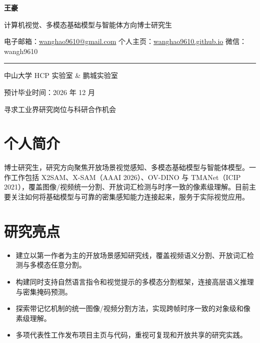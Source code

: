 \documentclass[UTF8,10pt,letterpaper,fontset=fandol]{ctexart}
\begin{document}
\fontsize{9.78}{11.75}\selectfont

\begin{minipage}{\textwidth}
    \vspace{4pt}
    \centering
    {\Huge\bfseries\color{ink} 王豪}\par
    \vspace{3pt}
    {\large\color{accentdark} 计算机视觉、多模态基础模型与智能体方向博士研究生}\par
    \vspace{5pt}
    {\small
      电子邮箱：\href{mailto:wanghao9610@gmail.com}{wanghao9610@gmail.com}
      \quad\textbar\quad
      个人主页：\href{https://wanghao9610.github.io/}{wanghao9610.github.io}
      \quad\textbar\quad
      微信：wangh9610
    }\par
    \vspace{5pt}
    {\color{rule}\rule{\linewidth}{0.5pt}}\par
    \vspace{4pt}
    \noindent
    \begin{minipage}[t]{0.62\textwidth}
      \RaggedRight\small 中山大学 HCP 实验室 \& 鹏城实验室
    \end{minipage}
    \hfill
    \begin{minipage}[t]{0.34\textwidth}
      \RaggedLeft\small 预计毕业时间：2026 年 12 月
    \end{minipage}\par
    \vspace{1pt}
    {\small\RaggedRight 寻求工业界研究岗位与科研合作机会\par}
    \vspace{1pt}
\end{minipage}

\section{个人简介}
博士研究生，研究方向聚焦开放场景视觉感知、多模态基础模型与智能体模型。一作工作包括 X2SAM、X-SAM（AAAI 2026）、OV-DINO 与 TMANet（ICIP 2021），覆盖图像/视频统一分割、开放词汇检测与时序一致的像素级理解。目前主要关注如何将基础模型与可靠的密集感知能力连接起来，服务于实际视觉应用。

\section{研究亮点}
  \begin{itemize}
    \item 建立以第一作者为主的开放场景感知研究线，覆盖视频语义分割、开放词汇检测与多模态任意分割。
    \item 构建同时支持自然语言指令和视觉提示的多模态分割框架，连接高层语义推理与密集掩码预测。
    \item 探索带记忆机制的统一图像/视频分割方法，实现跨帧时序一致的对象级和像素级理解。
    \item 多项代表性工作发布项目主页与代码，重视可复现和开放共享的研究实践。
  \end{itemize}
\end{document}
